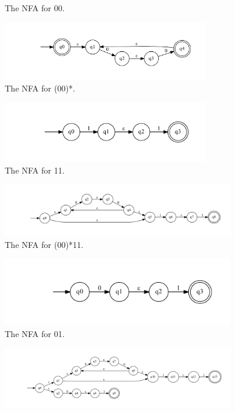 \documentclass[10pt] {article}
\begin{document}
\begin{enumerate}
\begin{figure}[H]
\caption{The NFA for 00.}
\label{9}
\end{figure}
\begin{figure}[H]
\includegraphics[width=0.8\textwidth]{bc19.pdf}
\caption{The NFA for (00)*.}
\label{10}
\end{figure}
\begin{figure}[H]
\includegraphics[width=0.8\textwidth]{bd19.pdf}
\caption{The NFA for 11.}
\label{11}
\end{figure}
\begin{figure}[H]
\includegraphics[width=0.9\textwidth]{be19.pdf}
\caption{The NFA for (00)*11.}
\label{12}
\end{figure}
\begin{figure}[H]
\includegraphics[width=0.9\textwidth]{bf19.pdf}
\caption{The NFA for 01.}
\label{13}
\end{figure}
\begin{figure}[H]
\includegraphics[width=0.9\textwidth]{bg19.pdf}

\end{figure}
\end{enumerate}
\end{document}
